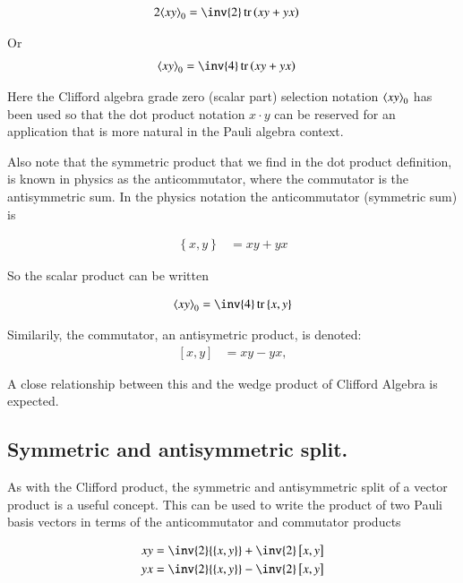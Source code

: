 \documentclass{article}
\DeclareMathOperator{\tr}{tr}
\newcommand{\trace}[1]{\tr{#1}}
\newcommand{\traceB}[1]{\tr\left({#1}\right)}
\newcommand{\symmetric}[2]{{\left\{{#1},{#2}\right\}}}
\newcommand{\antisymmetric}[2]{\left[{#1},{#2}\right]}
\begin{document}
\begin{align*}
2 \gpgradezero{x y} &= \inv{2}\traceB{x y + y x}
\end{align*}

Or
\begin{align}
\gpgradezero{x y} &= \inv{4}\traceB{x y + y x}
\end{align}

Here the Clifford algebra grade zero (scalar part) selection notation ${\left\langle{{x y}}\right\rangle}_{0}$ has been used so that the dot product notation $x \cdot y$ can be reserved for an application that is more natural in the Pauli algebra context.

Also note that the symmetric product that we find in the dot product definition, is known in physics as the anticommutator, where the commutator
is the antisymmetric sum.  In the physics notation the anticommutator (symmetric sum) is

\begin{align}\label{eqn:anticommutator}
\symmetric{x}{y} &= x y + y x
\end{align}

So the scalar product can be written

\begin{align}
\gpgradezero{ x y } = \inv{4}\trace{\symmetric{x}{y}}
\end{align}

Similarily, the commutator, an antisymetric product, is denoted:
\begin{align}\label{eqn:commutator}
\antisymmetric{x}{y} &= x y - y x,
\end{align}

A close relationship between this and the wedge product of Clifford Algebra is
expected.

\subsection{ Symmetric and antisymmetric split. }

As with the Clifford product, the symmetric and antisymmetric split of a vector
product is a useful concept.  This can be used to write the product 
of two Pauli basis vectors in terms of the anticommutator and commutator 
products

\begin{align}
x y &= \inv{2} \symmetric{x}{y} + \inv{2} \antisymmetric{x}{y} \\
y x &= \inv{2} \symmetric{x}{y} - \inv{2} \antisymmetric{x}{y}
\end{align}
\end{document}
